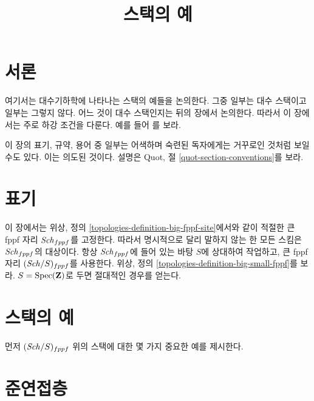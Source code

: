 

%


\title{스택의 예}


\maketitle

\label{section-phantom}

\tableofcontents

\section{서론}
\label{section-introduction}

\noindent
여기서는 대수기하학에 나타나는 스택의 예들을 논의한다. 그중 일부는 대수
스택이고 일부는 그렇지 않다. 어느 것이 대수 스택인지는 뒤의 장에서
논의한다. 따라서 이 장에서는 주로 하강 조건을 다룬다. 예를 들어
\cite{Vis2}를 보라.

\medskip\noindent
이 장의 표기, 규약, 용어 중 일부는 어색하며 숙련된 독자에게는 거꾸로인
것처럼 보일 수도 있다. 이는 의도된 것이다. 설명은 Quot, 절
\ref{quot-section-conventions}를 보라.




\section{표기}
\label{section-notation}

\noindent
이 장에서는 위상, 정의 \ref{topologies-definition-big-fppf-site}에서와
같이 적절한 큰 fppf 자리 $\mathit{Sch}_{fppf}$를 고정한다. 따라서 명시적으로
달리 말하지 않는 한 모든 스킴은 $\mathit{Sch}_{fppf}$의 대상이다. 항상
$\mathit{Sch}_{fppf}$에 들어 있는 바탕 $S$에 상대하여 작업하고, 큰 fppf 자리
$(\mathit{Sch}/S)_{fppf}$를 사용한다. 위상, 정의
\ref{topologies-definition-big-small-fppf}를 보라. $S = \mathop{\mathrm{Spec}}(\mathbf{Z})$로
두면 절대적인 경우를 얻는다.




\section{스택의 예}
\label{section-examples-stacks}

\noindent
먼저 $(\mathit{Sch}/S)_{fppf}$ 위의 스택에 대한 몇 가지 중요한 예를 제시한다.





\section{준연접층}
\label{section-stack-of-quasi-coherent-sheaves}

